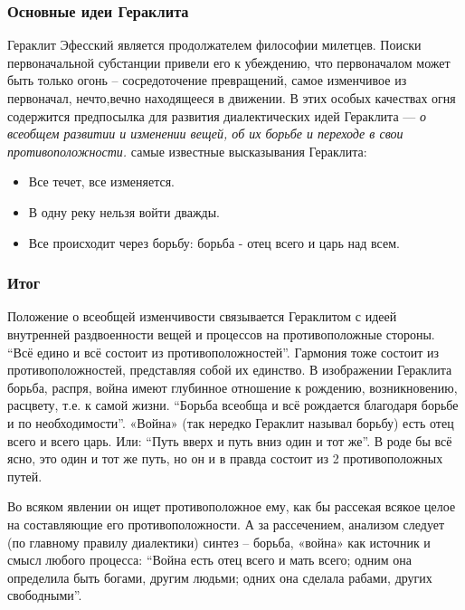 \documentclass[
]{article}
\providecommand{\tightlist}{%
  \setlength{\itemsep}{0pt}\setlength{\parskip}{0pt}}
\begin{document}
\hypertarget{ux43eux441ux43dux43eux432ux43dux44bux435-ux438ux434ux435ux438-ux433ux435ux440ux430ux43aux43bux438ux442ux430}{%
\subsubsection{Основные идеи
Гераклита}\label{ux43eux441ux43dux43eux432ux43dux44bux435-ux438ux434ux435ux438-ux433ux435ux440ux430ux43aux43bux438ux442ux430}}

Гераклит Эфесский является продолжателем философии милетцев. Поиски
первоначальной субстанции привели его к убеждению, что первоначалом
может быть только огонь -- сосредоточение превращений, самое изменчивое
из первоначал, нечто,вечно находящееся в движении. В этих особых
качествах огня содержится предпосылка для развития диалектических идей
Гераклита --- \emph{о всеобщем развитии и изменении вещей, об их борьбе
и переходе в свои противоположности.} самые известные высказывания
Гераклита:

\begin{itemize}
\tightlist
\item
  Все течет, все изменяется.
\item
  В одну реку нельзя войти дважды.
\item
  Все происходит через борьбу: борьба - отец всего и царь над всем.
\end{itemize}

\hypertarget{ux438ux442ux43eux433-2}{%
\subsubsection{Итог}\label{ux438ux442ux43eux433-2}}

Положение о всеобщей изменчивости связывается Гераклитом с идеей
внутренней раздвоенности вещей и процессов на противоположные стороны.
``Всё едино и всё состоит из противоположностей''. Гармония тоже состоит
из противоположностей, представляя собой их единство. В изображении
Гераклита борьба, распря, война имеют глубинное отношение к рождению,
возникновению, расцвету, т.е. к самой жизни. ``Борьба всеобща и всё
рождается благодаря борьбе и по необходимости''. «Война» (так нередко
Гераклит называл борьбу) есть отец всего и всего царь. Или: ``Путь вверх
и путь вниз один и тот же''. В роде бы всё ясно, это один и тот же путь,
но он и в правда состоит из 2 противоположных путей.

Во всяком явлении он ищет противоположное ему, как бы рассекая всякое
целое на составляющие его противоположности. А за рассечением, анализом
следует (по главному правилу диалектики) синтез -- борьба, «война» как
источник и смысл любого процесса: ``Война есть отец всего и мать всего;
одним она определила быть богами, другим людьми; одних она сделала
рабами, других свободными''.
\end{document}
